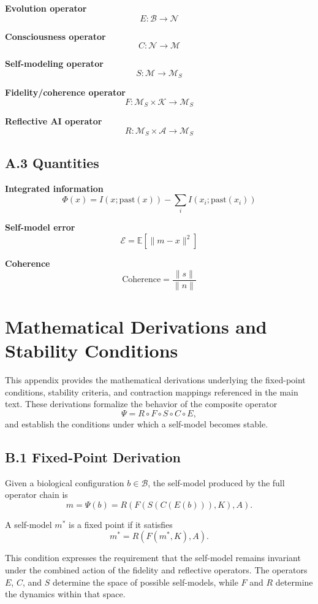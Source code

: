 \documentclass[12pt]{article}
\begin{document}
\textbf{Evolution operator}
\[
E: \mathcal{B} \to \mathcal{N}
\]

\textbf{Consciousness operator}
\[
C: \mathcal{N} \to \mathcal{M}
\]

\textbf{Self-modeling operator}
\[
S: \mathcal{M} \to \mathcal{M}_S
\]

\textbf{Fidelity/coherence operator}
\[
F: \mathcal{M}_S \times \mathcal{K} \to \mathcal{M}_S
\]

\textbf{Reflective AI operator}
\[
R: \mathcal{M}_S \times \mathcal{A} \to \mathcal{M}_S
\]

\subsection*{A.3 Quantities}

\textbf{Integrated information}
\[
\Phi(x) = I(x; \text{past}(x)) - \sum_i I(x_i; \text{past}(x_i))
\]

\textbf{Self-model error}
\[
\mathcal{E} = \mathbb{E}[\|m - x\|^2]
\]

\textbf{Coherence}
\[
\text{Coherence} = \frac{\|s\|}{\|n\|}
\]

\section{Mathematical Derivations and Stability Conditions}

This appendix provides the mathematical derivations underlying the fixed-point conditions, stability criteria, and contraction mappings referenced in the main text. These derivations formalize the behavior of the composite operator
\[
\Psi = R \circ F \circ S \circ C \circ E,
\]
and establish the conditions under which a self-model becomes stable.

\subsection*{B.1 Fixed-Point Derivation}

Given a biological configuration $b \in \mathcal{B}$, the self-model produced by the full operator chain is
\[
m = \Psi(b) = R(F(S(C(E(b))), K), A).
\]

A self-model $m^*$ is a fixed point if it satisfies
\[
m^* = R(F(m^*, K), A).
\]

This condition expresses the requirement that the self-model remains invariant under the combined action of the fidelity and reflective operators. The operators $E$, $C$, and $S$ determine the space of possible self-models, while $F$ and $R$ determine the dynamics within that space.
\end{document}
